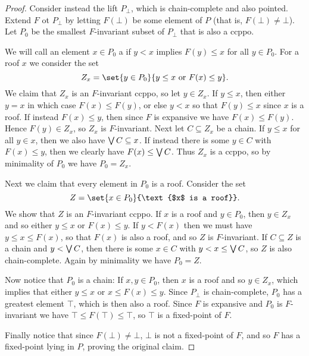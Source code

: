 \documentclass[a4paper, 11pt, article, danish, oneside]{memoir}
\DeclareMathOperator*{\smallbigvee}{\textstyle\bigvee}
\DeclareMathOperator*{\bigjoin}{\mathchoice
    {\smallbigvee}%
    {\bigvee}%
    {\bigvee}%
    {\bigvee}%
}
\begin{document}
\begin{proof}
    Consider instead the lift $P_\bot$, which is chain-complete and also pointed. Extend $F$ ot $P_\bot$ by letting $F(\bot)$ be some element of $P$ (that is, $F(\bot) \neq \bot$). Let $P_0$ be the smallest $F$-invariant subset of $P_\bot$ that is also a ccppo.
    
    We will call an element $x \in P_0$ a  if $y < x$ implies $F(y) \leq x$ for all $y \in P_0$. For a roof $x$ we consider the set
    \begin{equation*}
        Z_x
            = \set{y \in P_0}{y \leq x \text{ or } F(x) \leq y}.
    \end{equation*}
    We claim that $Z_x$ is an $F$-invariant ccppo, so let $y \in Z_x$. If $y \leq x$, then either $y = x$ in which case $F(x) \leq F(y)$, or else $y < x$ so that $F(y) \leq x$ since $x$ is a roof. If instead $F(x) \leq y$, then since $F$ is expansive we have $F(x) \leq F(y)$. Hence $F(y) \in Z_x$, so $Z_x$ is $F$-invariant. Next let $C \subseteq Z_x$ be a chain. If $y \leq x$ for all $y \in x$, then we also have $\bigjoin C \subseteq x$. If instead there is some $y \in C$ with $F(x) \leq y$, then we clearly have $F(x) \leq \bigjoin C$. Thus $Z_x$ is a ccppo, so by minimality of $P_0$ we have $P_0 = Z_x$.

    Next we claim that every element in $P_0$ is a roof. Consider the set
    \begin{equation*}
        Z
            = \set{x \in P_0}{\text{$x$ is a roof}}.
    \end{equation*}
    We show that $Z$ is an $F$-invariant ccppo. If $x$ is a roof and $y \in P_0$, then $y \in Z_x$ and so either $y \leq x$ or $F(x) \leq y$. If $y < F(x)$ then we must have $y \leq x \leq F(x)$, so that $F(x)$ is also a roof, and so $Z$ is $F$-invariant. If $C \subseteq Z$ is a chain and $y < \bigjoin C$, then there is some $x \in C$ with $y < x \leq \bigjoin C$, so $Z$ is also chain-complete. Again by minimality we have $P_0 = Z$.

    Now notice that $P_0$ is a chain: If $x,y \in P_0$, then $x$ is a roof and so $y \in Z_x$, which implies that either $y \leq x$ or $x \leq F(x) \leq y$. Since $P_\bot$ is chain-complete, $P_0$ has a greatest element $\top$, which is then also a roof. Since $F$ is expansive and $P_0$ is $F$-invariant we have $\top \leq F(\top) \leq \top$, so $\top$ is a fixed-point of $F$.

    Finally notice that since $F(\bot) \neq \bot$, $\bot$ is not a fixed-point of $F$, and so $F$ has a fixed-point lying in $P$, proving the original claim.
\end{proof}
\end{document}
